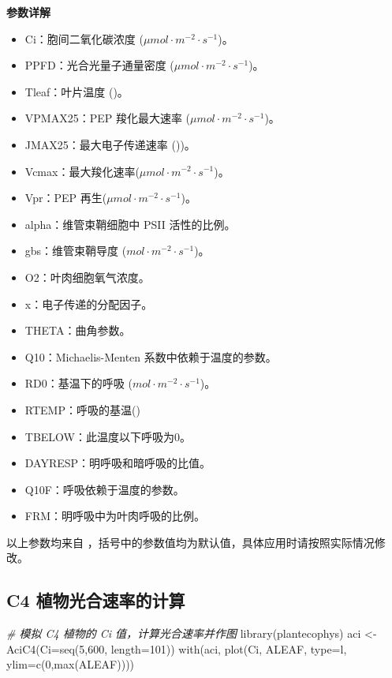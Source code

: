 \documentclass[
]{krantz}
\makeatletter
\newenvironment{Shaded}{\begin{snugshade}}{\end{snugshade}}
\newcommand{\AttributeTok}[1]{\textcolor[rgb]{0.77,0.63,0.00}{#1}}
\newcommand{\CommentTok}[1]{\textcolor[rgb]{0.56,0.35,0.01}{\textit{#1}}}
\newcommand{\DecValTok}[1]{\textcolor[rgb]{0.00,0.00,0.81}{#1}}
\newcommand{\FunctionTok}[1]{\textcolor[rgb]{0.00,0.00,0.00}{#1}}
\newcommand{\NormalTok}[1]{#1}
\newcommand{\OtherTok}[1]{\textcolor[rgb]{0.56,0.35,0.01}{#1}}
\newcommand{\StringTok}[1]{\textcolor[rgb]{0.31,0.60,0.02}{#1}}
\providecommand{\tightlist}{%
  \setlength{\itemsep}{0pt}\setlength{\parskip}{0pt}}
\newenvironment{kframe}{%
\medskip{}
\setlength{\fboxsep}{.8em}
 \def\at@end@of@kframe{}%
 \ifinner\ifhmode%
  \def\at@end@of@kframe{\end{minipage}}%
  \begin{minipage}{\columnwidth}%
 \fi\fi%
 \def\FrameCommand##1{\hskip\@totalleftmargin \hskip-\fboxsep
 \colorbox{shadecolor}{##1}\hskip-\fboxsep
     \hskip-\linewidth \hskip-\@totalleftmargin \hskip\columnwidth}%
 \MakeFramed {\advance\hsize-\width
   \@totalleftmargin\z@ \linewidth\hsize
   \@setminipage}}%
 {\par\unskip\endMakeFramed%
 \at@end@of@kframe}
\renewenvironment{Shaded}{\begin{kframe}}{\end{kframe}}
\makeatother
\begin{document}
\textbf{参数详解}

\begin{itemize}
\tightlist
\item
  Ci：胞间二氧化碳浓度 (\(\mu mol\cdot m^{-2}\cdot s^{-1}\))。
\item
  PPFD：光合光量子通量密度 (\(\mu mol\cdot m^{-2}\cdot s^{-1}\))。
\item
  Tleaf：叶片温度 (\textcelsius)。
\item
  VPMAX25：PEP 羧化最大速率 (\(\mu mol\cdot m^{-2}\cdot s^{-1}\))。
\item
  JMAX25：最大电子传递速率 (\textcelsius))。
\item
  Vcmax：最大羧化速率(\(\mu mol\cdot m^{-2}\cdot s^{-1}\))。
\item
  Vpr：PEP 再生(\(\mu mol\cdot m^{-2}\cdot s^{-1}\))。
\item
  alpha：维管束鞘细胞中 PSII 活性的比例。
\item
  gbs：维管束鞘导度 (\(mol\cdot m^{-2}\cdot s^{-1}\))。
\item
  O2：叶肉细胞氧气浓度。
\item
  x：电子传递的分配因子。
\item
  THETA：曲角参数。
\item
  Q10：Michaelis-Menten 系数中依赖于温度的参数。
\item
  RD0：基温下的呼吸 (\(mol\cdot m^{-2}\cdot s^{-1}\))。
\item
  RTEMP：呼吸的基温(\textcelsius)
\item
  TBELOW：此温度以下呼吸为0。
\item
  DAYRESP：明呼吸和暗呼吸的比值。
\item
  Q10F：呼吸依赖于温度的参数。
\item
  FRM：明呼吸中为叶肉呼吸的比例。
\end{itemize}

以上参数均来自 \citet{Caemmerer2000Biochemical}，括号中的参数值均为默认值，具体应用时请按照实际情况修改。

\hypertarget{c4_sim}{%
\subsection{C4 植物光合速率的计算}\label{c4_sim}}

\begin{Shaded}
\begin{Highlighting}[]
\CommentTok{\# 模拟 C4 植物的 Ci 值，计算光合速率并作图}
\FunctionTok{library}\NormalTok{(plantecophys)}
\NormalTok{aci }\OtherTok{\textless{}{-}} \FunctionTok{AciC4}\NormalTok{(}\AttributeTok{Ci=}\FunctionTok{seq}\NormalTok{(}\DecValTok{5}\NormalTok{,}\DecValTok{600}\NormalTok{, }\AttributeTok{length=}\DecValTok{101}\NormalTok{))}
\FunctionTok{with}\NormalTok{(aci, }\FunctionTok{plot}\NormalTok{(Ci, ALEAF, }\AttributeTok{type=}\StringTok{\textquotesingle{}l\textquotesingle{}}\NormalTok{, }\AttributeTok{ylim=}\FunctionTok{c}\NormalTok{(}\DecValTok{0}\NormalTok{,}\FunctionTok{max}\NormalTok{(ALEAF))))}
\end{Highlighting}
\end{Shaded}
\end{document}
